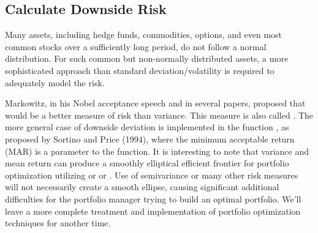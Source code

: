 \documentclass[12pt,letterpaper,english]{article}
\begin{document}
\subsection{Calculate Downside Risk}

Many assets, including hedge funds, commodities, options, and even
most common stocks over a sufficiently long period, do not follow
a normal distribution. For such common but non-normally distributed
assets, a more sophisticated approach than standard deviation/volatility
is required to adequately model the risk.

Markowitz, in his Nobel acceptance speech and in several papers, proposed
that  would be a better measure of
risk than variance.
This measure is also called . The
more general case of downside deviation is implemented in the function
, as proposed by Sortino and Price (1994),
where the minimum acceptable return (MAR) is a parameter to the function.
It is interesting to note that variance and mean return can produce
a smoothly elliptical efficient frontier for portfolio optimization
utilizing  or 
or . Use of semivariance
or many other risk measures will not necessarily create a smooth ellipse,
causing significant additional difficulties for the portfolio manager
trying to build an optimal portfolio. We'll leave a more complete
treatment and implementation of portfolio optimization techniques
for another time.
\end{document}
